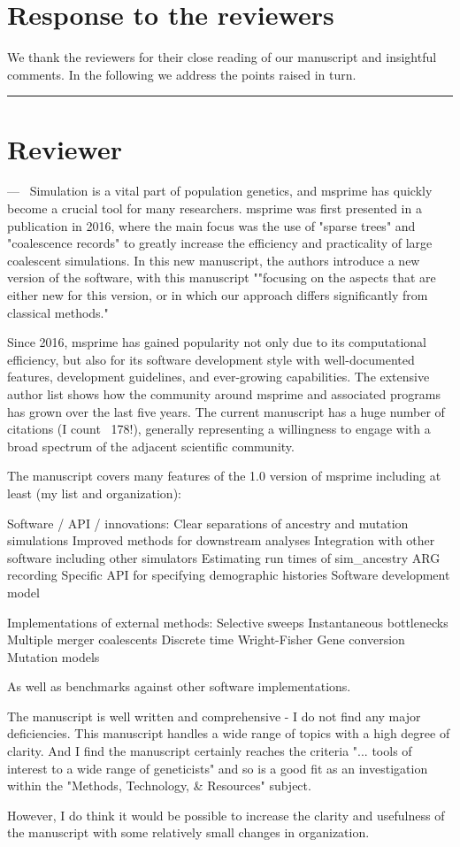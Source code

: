\documentclass[11pt]{article}
\newcounter{reviewer}
\newcounter{point}[reviewer]
\renewcommand{\thepoint}{\thereviewer.\arabic{point}}
\newcommand{\reviewersection}{\stepcounter{reviewer} \bigskip \hrule
                  \section*{Reviewer \thereviewer}}
\newenvironment{point}
   {\refstepcounter{point} \bigskip \noindent {\textbf{Reviewer~Point~\thepoint} } ---\ }
   {\par }
\begin{document}
\section*{Response to the reviewers}
We thank the reviewers for their close reading of our manuscript and
insightful comments. In the following we address the points raised
in turn.

\reviewersection

\begin{point}
Simulation is a vital part of population genetics, and msprime has quickly
become a crucial tool for many researchers. msprime was first presented in a
publication in 2016, where the main focus was the use of "sparse trees" and
"coalescence records" to greatly increase the efficiency and practicality of
large coalescent simulations. In this new manuscript, the authors introduce a
new version of the software, with this manuscript ""focusing on the aspects
that are either new for this version, or in which our approach differs
significantly from classical methods."

Since 2016, msprime has gained popularity not only due to its computational
efficiency, but also for its software development style with well-documented
features, development guidelines, and ever-growing capabilities. The extensive
author list shows how the community around msprime and associated programs has
grown over the last five years. The current manuscript has a huge number of
citations (I count ~178!), generally representing a willingness to engage with
a broad spectrum of the adjacent scientific community.

The manuscript covers many features of the 1.0 version of msprime including at
least (my list and organization):

Software / API / innovations:
Clear separations of ancestry and mutation simulations
Improved methods for downstream analyses
Integration with other software including other simulators
Estimating run times of sim\_ancestry
ARG recording
Specific API for specifying demographic histories
Software development model

Implementations of external methods:
Selective sweeps
Instantaneous bottlenecks
Multiple merger coalescents
Discrete time Wright-Fisher
Gene conversion
Mutation models

As well as benchmarks against other software implementations.

The manuscript is well written and comprehensive - I do not find any major
deficiencies. This manuscript handles a wide range of topics with a high degree
of clarity. And I find the manuscript certainly reaches the criteria "... tools
of interest to a wide range of geneticists" and so is a good fit as an
investigation within the "Methods, Technology, \& Resources" subject.

However, I do think it would be possible to increase the clarity and usefulness
of the manuscript with some relatively small changes in organization.
\end{point}
\end{document}
